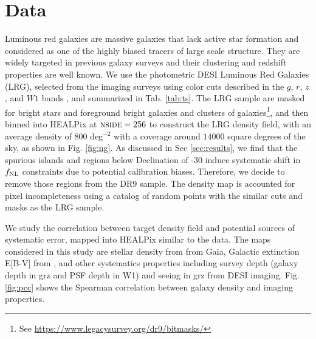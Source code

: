 \section{Data}
\label{sec:data}
Luminous red galaxies are massive galaxies that lack active star formation and considered as one of the highly biased tracers of large scale structure. They are widely targeted in previous galaxy surveys and their clustering and redshift properties are well known. We use the photometric DESI Luminous Red Galaxies (LRG), selected from the imaging surveys \citep{dey2018overview} using color cuts described in the $g$, $r$, $z$, and $W1$ bands \citep[see,][]{zhou2021clustering}, and summarized in Tab. \ref{tab:ts}. The LRG sample are masked for bright stars and foreground bright galaxies and clusters of galaxies\footnote{See \url{https://www.legacysurvey.org/dr9/bitmasks/}}, and then binned into HEALPix \citep{gorski2005healpix} at $\textsc{nside}=256$ to construct the LRG density field, with an average density of $800$ deg$^{-2}$ with a coverage around $14000$ square degrees of the sky, as shown in Fig. \ref{fig:ng}. As discussed in Sec \ref{sec:results}, we find that the spurious islands and regions below Declination of -30 induce systematic shift in $f_{\rm NL}$ constraints due to potential calibration biases. Therefore, we decide to remove those regions from the DR9 sample. The density map is accounted for pixel incompleteness using a catalog of random points with the similar cuts and masks as the LRG sample. 

We study the correlation between target density field and potential sources of systematic error, mapped into HEALPix similar to the data. The maps considered in this study are stellar density from  from Gaia,  Galactic extinction E[B-V] from \cite{schlegel1998maps}, and other systematics properties including survey depth (galaxy depth in grz and PSF depth in W1) and seeing in grz from DESI imaging. Fig. \ref{fig:pcc} shows the Spearman correlation between galaxy density and imaging properties. 


